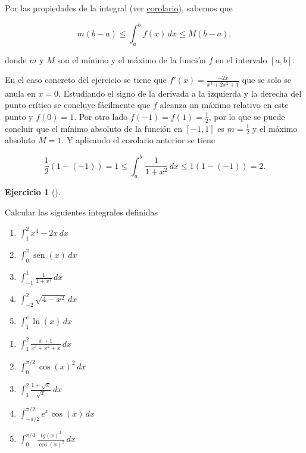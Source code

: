 \documentclass[
  spanish,
  a4paper,
]{scrreport}
\theoremstyle{definition}
\newtheorem{exercise}{Ejercicio}[chapter]
\theoremstyle{remark}
\begin{document}
\begin{tcolorbox}[enhanced jigsaw, arc=.35mm, bottomrule=.15mm, bottomtitle=1mm, breakable, colback=white, colbacktitle=quarto-callout-tip-color!10!white, colframe=quarto-callout-tip-color-frame, coltitle=black, left=2mm, leftrule=.75mm, opacityback=0, opacitybacktitle=0.6, rightrule=.15mm, title=\textcolor{quarto-callout-tip-color}{\faLightbulb}\hspace{0.5em}{Solución}, titlerule=0mm, toprule=.15mm, toptitle=1mm]

Por las propiedades de la integral (ver
\href{https://aprendeconalf.es/analisis-manual/08-integrales.html\#cor-integral-funcion-acotada}{corolario}),
sabemos que

\[
m(b-a)\leq \int_a^b f(x)\,dx \leq M(b-a),
\]

donde \(m\) y \(M\) son el mínimo y el máximo de la función \(f\) en el
intervalo \([a,b]\).

En el caso concreto del ejercicio se tiene que
\(f'(x) = \frac{-2x}{x^4+2x^2+1}\) que se solo se anula en \(x=0\).
Estudiando el signo de la derivada a la izquierda y la derecha del punto
crítico se concluye fácilmente que \(f\) alcanza un máximo relativo en
este punto y \(f(0)=1\). Por otro lado \(f(-1)=f(1)=\frac{1}{2}\), por
lo que se puede concluir que el mínimo absoluto de la función en
\([-1,1]\) es \(m=\frac{1}{2}\) y el máximo absoluto \(M=1\). Y
aplicando el corolario anterior se tiene

\[
\frac{1}{2}(1-(-1)) = 1 \leq \int_a^b \frac{1}{1+x^2}\,dx \leq 1(1-(-1)) = 2.
\]

\end{tcolorbox}

\begin{exercise}[]\protect\hypertarget{exr-integrales-definidas}{}\label{exr-integrales-definidas}

Calcular las siguientes integrales definidas

\begin{enumerate}
\def\labelenumi{\alph{enumi}.}
\item
  \(\int_1^2 x^4-2x\,dx\)
\item
  \(\int_0^{\pi} \operatorname{sen}(x)\, dx\)
\item
  \(\int_{-1}^1 \frac{1}{1+x^2}\,dx\)
\item
  \(\int_{-2}^2 \sqrt{4-x^2}\,dx\)
\item
  \(\int_1^e \ln(x)\,dx\)
\end{enumerate}

\begin{enumerate}
\def\labelenumi{\alph{enumi}.}
\setcounter{enumi}{5}
\item
  \(\int_1^2 \frac{x+1}{x^3+x^2+x}\,dx\)
\item
  \(\int_0^{\pi/2} \cos(x)^2\, dx\)
\item
  \(\int_1^2 \frac{1+\sqrt{x}}{\sqrt{x}}\,dx\)
\item
  \(\int_{-\pi/2}^{\pi/2} e^x\cos(x)\,dx\)
\item
  \(\int_{0}^{\pi/4}\frac{tg(x)^3}{\cos(x)^2}\,dx\)
\end{enumerate}

\end{exercise}
\end{document}

